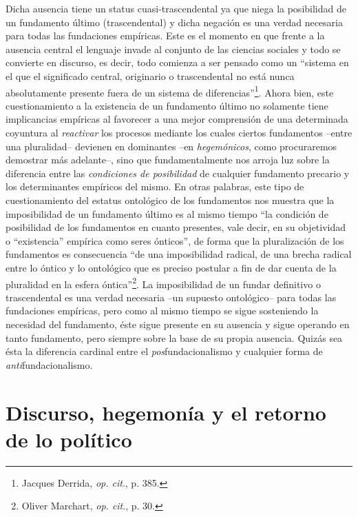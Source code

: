 Dicha ausencia tiene un status cuasi-trascendental ya que niega la
posibilidad de un fundamento último (trascendental) y dicha negación es
una verdad necesaria para todas las fundaciones empíricas. Este es el
momento en que frente a la ausencia central el lenguaje invade al
conjunto de las ciencias sociales y todo se convierte en discurso, es
decir, todo comienza a ser pensado como un \enquote{sistema en el que el
significado central, originario o trascendental no está nunca
absolutamente presente fuera de un sistema de diferencias}\footnote{Jacques
  Derrida, \emph{op. cit}., p. 385.}. Ahora bien, este cuestionamiento a
la existencia de un fundamento último no solamente tiene implicancias
empíricas al favorecer a una mejor comprensión de una determinada
coyuntura al \emph{reactivar} los procesos mediante los cuales ciertos
fundamentos --entre una pluralidad-- devienen en dominantes --en
\emph{hegemónicos}, como procuraremos demostrar más adelante--, sino que
fundamentalmente nos arroja luz sobre la diferencia entre las
\emph{condiciones de posibilidad} de cualquier fundamento precario y los
determinantes empíricos del mismo. En otras palabras, este tipo de
cuestionamiento del estatus ontológico de los fundamentos nos muestra
que la imposibilidad de un fundamento último es al mismo tiempo \enquote{la
condición de posibilidad de los fundamentos en cuanto presentes, vale
decir, en su objetividad o ``existencia'' empírica como seres ónticos},
de forma que la pluralización de los fundamentos es consecuencia \enquote{de una
imposibilidad radical, de una brecha radical entre lo óntico y lo
ontológico que es preciso postular a fin de dar cuenta de la pluralidad
en la esfera óntica}\footnote{Oliver Marchart, \emph{op. cit}., p. 30.}.
La imposibilidad de un fundar definitivo o trascendental es una verdad
necesaria --un supuesto ontológico-- para todas las fundaciones
empíricas, pero como al mismo tiempo se sigue sosteniendo la necesidad
del fundamento, éste sigue presente en su ausencia y sigue operando en
tanto fundamento, pero siempre sobre la base de su propia ausencia.
Quizás sea ésta la diferencia cardinal entre el
\emph{pos}fundacionalismo y cualquier forma de
\emph{anti}fundacionalismo.

\hypertarget{discurso-hegemonuxeda-y-el-retorno-de-lo-poluxedtico}{%
\section{Discurso, hegemonía y el retorno de lo político}
\label{discurso-hegemonuxeda-y-el-retorno-de-lo-poluxedtico}}

